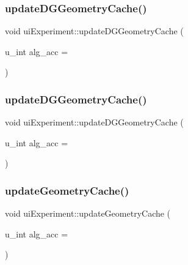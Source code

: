\subsubsection{\texorpdfstring{update\+D\+G\+Geometry\+Cache()}{updateDGGeometryCache()}\hspace{0.1cm}{\footnotesize\ttfamily [1/2]}}
{\footnotesize\ttfamily void ui\+Experiment\+::update\+D\+G\+Geometry\+Cache (\begin{DoxyParamCaption}\item[{u\+\_\+int}]{alg\+\_\+acc = {} }\end{DoxyParamCaption})}

\mbox{\label{classui_experiment_a0c145963361c8f511360e994833a48ef}} 
\subsubsection{\texorpdfstring{update\+D\+G\+Geometry\+Cache()}{updateDGGeometryCache()}\hspace{0.1cm}{\footnotesize\ttfamily [2/2]}}
{\footnotesize\ttfamily void ui\+Experiment\+::update\+D\+G\+Geometry\+Cache (\begin{DoxyParamCaption}\item[{u\+\_\+int}]{alg\+\_\+acc = {} }\end{DoxyParamCaption})}

\mbox{\label{classui_experiment_a406d18d100eaa0c03139590bfa6092af}} 
\subsubsection{\texorpdfstring{update\+Geometry\+Cache()}{updateGeometryCache()}\hspace{0.1cm}{\footnotesize\ttfamily [1/2]}}
{\footnotesize\ttfamily void ui\+Experiment\+::update\+Geometry\+Cache (\begin{DoxyParamCaption}\item[{u\+\_\+int}]{alg\+\_\+acc = {} }\end{DoxyParamCaption})}


